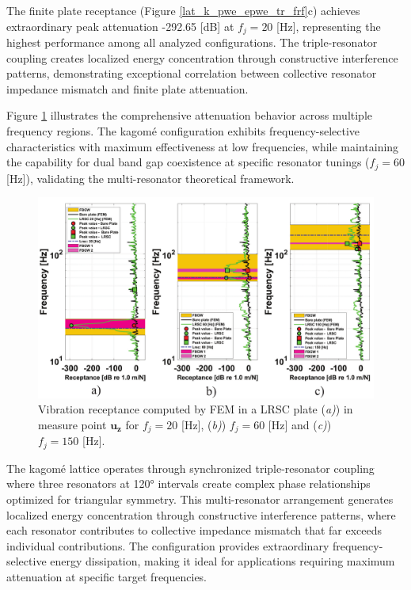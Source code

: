 \documentclass[review,numbers,sort&compress]{elsarticle}
\begin{document}
{The finite plate receptance (Figure \ref{lat_k_pwe_epwe_tr_frf}c) achieves extraordinary peak attenuation -292.65 [dB] at $f_j = 20$ [Hz], representing the highest performance among all analyzed configurations. The triple-resonator coupling creates localized energy concentration through constructive interference patterns, demonstrating exceptional correlation between collective resonator impedance mismatch and finite plate attenuation.

Figure \ref{lat_k_tr_frf_f1_f2_f3} illustrates the comprehensive attenuation behavior across multiple frequency regions. The kagomé configuration exhibits frequency-selective characteristics with maximum effectiveness at low frequencies, while maintaining the capability for dual band gap coexistence at specific resonator tunings ($f_j = 60$ [Hz]), validating the multi-resonator theoretical framework.

\begin{figure}[htb]
	\centering
	\includegraphics[width=1.0\textwidth]{2_5_disp_frf_kag_3_receps.pdf}
	\caption{Vibration receptance computed by FEM in a LRSC plate (\textit{a)}) in measure point $\mathbf{u_z}$  for $f_j = 20$ [Hz], (\textit{b)}) $f_j = 60$ [Hz] and (\textit{c)}) $f_j = 150$ [Hz].}
	\label{lat_k_tr_frf_f1_f2_f3}
\end{figure}

The kagomé lattice operates through synchronized triple-resonator coupling where three resonators at 120° intervals create complex phase relationships optimized for triangular symmetry. This multi-resonator arrangement generates localized energy concentration through constructive interference patterns, where each resonator contributes to collective impedance mismatch that far exceeds individual contributions. The configuration provides extraordinary frequency-selective energy dissipation, making it ideal for applications requiring maximum attenuation at specific target frequencies.

}
\end{document}

